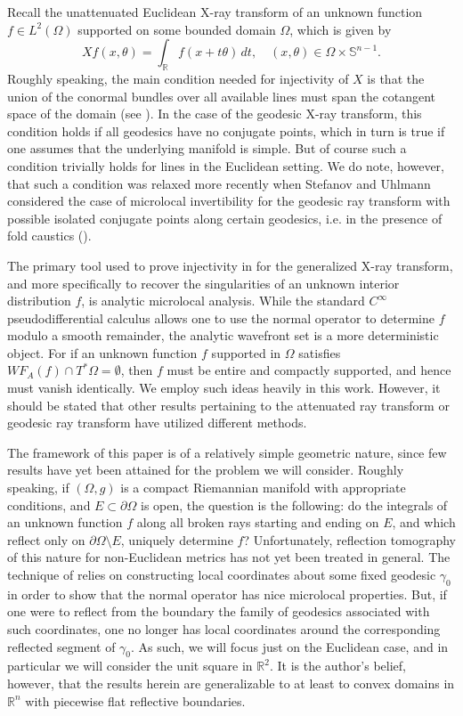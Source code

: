 \documentclass[10pt]{amsart}
\theoremstyle{definition}
\theoremstyle{definition}
\theoremstyle{definition}
\newcommand{ \rn }[1]{\mathbb{R}^{#1}}
\begin{document}
Recall the unattenuated Euclidean X-ray transform of an unknown function $f \in L^{2}(\Omega)$ supported on some bounded domain $\Omega$, which is given by
\begin{equation*}
Xf(x,\theta) = \int_{\mathbb{R}}f(x+t\theta)\,dt, \quad (x,\theta) \in \Omega \times \mathbb{S}^{n-1}.
\end{equation*}
Roughly speaking, the main condition needed for injectivity of $X$ is that the union of the conormal bundles over all available lines must span the cotangent space of the domain (see \cite{xraygeneric}). In the case of the geodesic X-ray transform, this condition holds if all geodesics have no conjugate points, which in turn is true if one assumes that the underlying manifold is simple. But of course such a condition trivially holds for lines in the Euclidean setting. We do note, however, that such a condition was relaxed more recently when Stefanov and Uhlmann considered the case of microlocal invertibility for the geodesic ray transform with possible isolated conjugate points along certain geodesics, i.e. in the presence of fold caustics (\cite{causticxray}).  

The primary tool used to prove injectivity in \cite{xraygeneric} for the generalized X-ray transform, and more specifically to recover the singularities of an unknown interior distribution $f$, is analytic microlocal analysis. While the standard $C^{\infty}$ pseudodifferential calculus allows one to use the normal operator to determine $f$ modulo a smooth remainder, the analytic wavefront set is a more deterministic object. For if an unknown function $f$ supported in $\Omega$ satisfies $WF_{A}(f) \cap T^{*}\Omega = \emptyset$, then $f$ must be entire and compactly supported, and hence must vanish identically. We employ such ideas heavily in this work. However, it should be stated that other results pertaining to the attenuated ray transform or geodesic ray transform have utilized different methods.

The framework of this paper is of a relatively simple geometric nature, since few results have yet been attained for the problem we will consider. Roughly speaking, if $(\Omega, g)$ is a compact Riemannian manifold with appropriate conditions, and $E \subset \partial \Omega$ is open, the question is the following: do the integrals of an unknown function $f$ along all broken rays starting and ending on $E$, and which reflect only on $\partial \Omega \setminus E$, uniquely determine $f$? Unfortunately, reflection tomography of this nature for non-Euclidean metrics has not yet been treated in general. The technique of \cite{xraygeneric} relies on constructing local coordinates about some fixed geodesic $\gamma_{0}$ in order to show that the normal operator has nice microlocal properties. But, if one were to reflect from the boundary the family of geodesics associated with such coordinates, one no longer has local coordinates around the corresponding reflected segment of $\gamma_{0}$. As such, we will focus just on the Euclidean case, and in particular we will consider the unit square in $\rn{2}$. It is the author's belief, however, that the results herein are generalizable to at least to convex domains in $\rn{n}$ with piecewise flat reflective boundaries.
\end{document}
